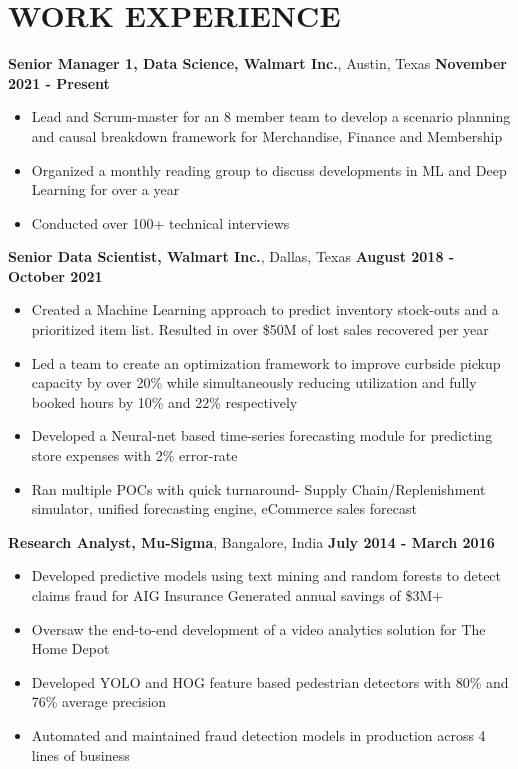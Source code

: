\documentclass{article}
\begin{document}
\section*{WORK EXPERIENCE}
\noindent
\textbf{Senior Manager 1,  Data Science, Walmart Inc.}, Austin, Texas  \hfill \textbf{November 2021 - Present}
\begin{itemize}
    \item Lead and Scrum-master for an 8 member team to develop a scenario planning and causal breakdown framework for Merchandise, Finance and Membership 
    \item Organized a monthly reading group to discuss developments in ML and Deep Learning for over a year
    \item Conducted over 100+ technical interviews
\end{itemize}
\textbf{Senior Data Scientist, Walmart Inc.}, Dallas, Texas  \hfill \textbf{August 2018 - October 2021}
\begin{itemize}
    \item Created a Machine Learning approach to predict inventory stock-outs and a prioritized item list. Resulted in over \$50M of lost sales recovered per year
    \item Led a team to create an optimization framework to improve curbside pickup capacity by over 20\% while simultaneously reducing utilization and fully booked hours by 10\% and 22\% respectively
    \item Developed a Neural-net based time-series forecasting module for predicting store expenses with 2\% error-rate
    \item Ran multiple POCs with quick turnaround-  Supply Chain/Replenishment simulator, unified forecasting engine, eCommerce sales forecast
\end{itemize}
\textbf{Research Analyst, Mu-Sigma}, Bangalore, India  \hfill \textbf{July 2014 - March 2016}
\begin{itemize}
    \item Developed predictive models using text mining and
        random forests to detect claims fraud for AIG Insurance
        Generated annual savings of \$3M+ 
    \item Oversaw the end-to-end development of a video analytics solution for The Home Depot
    \item Developed YOLO and HOG feature based pedestrian detectors with 80\% and 76\% average precision
    \item Automated and maintained fraud detection models in production across 4 lines of business

\end{itemize}
\end{document}
